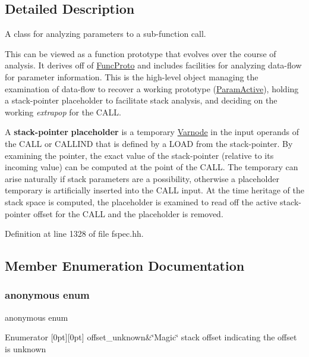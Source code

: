 \subsection{Detailed Description}
A class for analyzing parameters to a sub-\/function call. 

This can be viewed as a function prototype that evolves over the course of analysis. It derives off of \mbox{\hyperlink{class_func_proto}{Func\+Proto}} and includes facilities for analyzing data-\/flow for parameter information. This is the high-\/level object managing the examination of data-\/flow to recover a working prototype (\mbox{\hyperlink{class_param_active}{Param\+Active}}), holding a stack-\/pointer placeholder to facilitate stack analysis, and deciding on the working {\itshape extrapop} for the C\+A\+LL.

A {\bfseries{stack-\/pointer}} {\bfseries{placeholder}} is a temporary \mbox{\hyperlink{class_varnode}{Varnode}} in the input operands of the C\+A\+LL or C\+A\+L\+L\+I\+ND that is defined by a L\+O\+AD from the stack-\/pointer. By examining the pointer, the exact value of the stack-\/pointer (relative to its incoming value) can be computed at the point of the C\+A\+LL. The temporary can arise naturally if stack parameters are a possibility, otherwise a placeholder temporary is artificially inserted into the C\+A\+LL input. At the time heritage of the stack space is computed, the placeholder is examined to read off the active stack-\/pointer offset for the C\+A\+LL and the placeholder is removed. 

Definition at line 1328 of file fspec.\+hh.



\subsection{Member Enumeration Documentation}
\mbox{\label{class_func_call_specs_a5f7aaec10dc1e68d73a07eaf4cac2542}} 
\subsubsection{\texorpdfstring{anonymous enum}{anonymous enum}}
{\footnotesize\ttfamily anonymous enum}

\begin{DoxyEnumFields}{Enumerator}
[0pt][0pt]{}\mbox{\label{class_func_call_specs_a5f7aaec10dc1e68d73a07eaf4cac2542a584ec7401809588c22798803bff5b796}} 
offset\+\_\+unknown&\char`\"{}\+Magic\char`\"{} stack offset indicating the offset is unknown \\
\hline

\end{DoxyEnumFields}


